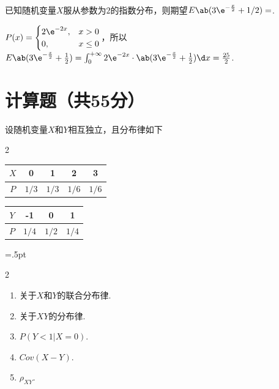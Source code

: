 \begin{problem}
    已知随机变量$X$服从参数为$2$的指数分布，则期望$E\ab(3\e^{-\frac x2}+1/2)=$.
\end{problem}
\begin{solution}
    $P(x)=\begin{cases}
        2\e^{-2x}, & x>0\\
        0, & x\leq 0
    \end{cases}$，所以$E\ab(3\e^{-\frac x2}+\frac12)=\int_0^{+\infty}2\e^{-2x}\cdot\ab(3\e^{-\frac x2}+\frac12)\d x=\frac{25}{2}$.
\end{solution}

\section{计算题（共55分）}
\begin{problem}
设随机变量$X$和$Y$相互独立，且分布律如下
\begin{multicols}{2}
\centering
\begin{tabular}{c|cccc}
\toprule
    $X$ & 0 & 1 & 2 & 3\\
\hline
    $P$ & $1/3$ & $1/3$ & $1/6$ & $1/6$\\
\bottomrule
\end{tabular}

\begin{tabular}{c|ccc}
    \toprule
        $Y$ & -1 & 0 & 1\\
    \hline
        $P$ & $1/4$ & $1/2$ & $1/4$\\
    \bottomrule
    \end{tabular}
\end{multicols}
\columnseprule=.5pt
\begin{multicols}{2}
\begin{enumerate}
    \item 关于$X$和$Y$的联合分布律.
    \item 关于$XY$的分布律.
    \item $P(Y<1|X=0)$.
    \item $Cov(X-Y)$.
    \item $\rho_{XY}$.
\end{enumerate}
\end{multicols}
\end{problem}
